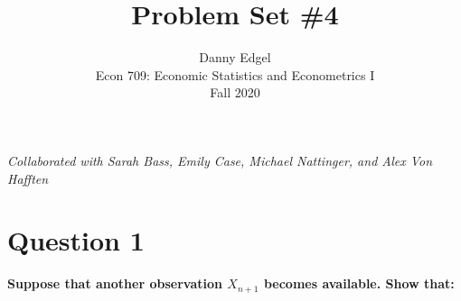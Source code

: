 \documentclass{article}
\begin{document}
\title{	Problem Set \#4 }
\author{ 	Danny Edgel 										\\ 
			Econ 709: Economic Statistics and Econometrics I	\\
			Fall 2020											\\
		}
\maketitle\thispagestyle{empty}


\noindent\textit{Collaborated with Sarah Bass, Emily Case, Michael Nattinger, and Alex Von Hafften}

\section*{Question 1}
\textbf{Suppose that another observation $X_{n+1}$ becomes available. Show that:}
\end{document}
